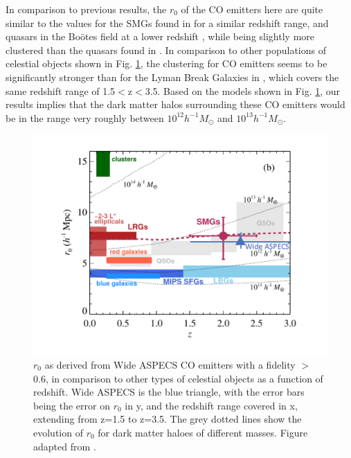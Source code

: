 In comparison to previous results, the $r_0$ of the CO emitters here are quite similar to the values for the SMGs found in \cite{10.1111/j.1365-2966.2011.20303.x} for a similar redshift range, and quasars in the Bo\"otes field at a lower redshift \cite{hickox2011clustering}, while being slightly more clustered than the quasars found in \cite{ross2009clustering}. In comparison to other populations of celestial objects shown in Fig. \ref{fig:Hickox_ASPECS}, the clustering for CO emitters seems to be significantly stronger than for the Lyman Break Galaxies in \cite{adelberger2005spatial}, which covers the same redshift range of 1.5$<$z$<$3.5. Based on the models shown in Fig. \ref{fig:Hickox_ASPECS}, our results implies that the dark matter halos surrounding these CO emitters would be in the range very roughly between $10^{12} h^{-1}M_{\odot}$ and $10^{13} h^{-1}M_{\odot}$.

\begin{figure}[!htbp]
\centering \includegraphics[width=120mm]{clustering/Hickox_WideASPECS.png}
\caption{$r_0$ as derived from Wide ASPECS CO emitters with a fidelity $>$ 0.6, in comparison to other types of celestial objects as a function of redshift. Wide ASPECS is the blue triangle, with the error bars being the error on $r_0$ in y, and the redshift range covered in x, extending from z=1.5 to z=3.5. The grey dotted lines show the evolution of $r_0$ for dark matter haloes of different masses. Figure adapted from \cite{10.1111/j.1365-2966.2011.20303.x}.}
\label{fig:Hickox_ASPECS}
\end{figure}

